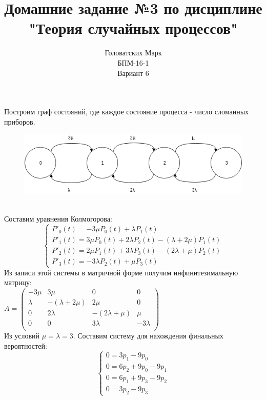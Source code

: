 \documentclass [a4paper,12pt]{article}
\title{Домашние задание №3 по дисциплине "Теория случайных процессов"}
\author{Головатских Марк \\БПМ-16-1 \\ Вариант 6}
\date{}
\begin{document}
\maketitle
{}
\newpage
{}
Построим граф состояний, где каждое состояние процесса - число сломанных приборов.\\
\begin{figure}[h!]
  \includegraphics[width=\linewidth]{pic3.png}
\end{figure}\\
Составим уравнения Колмогорова:\\
\begin{equation*}
\begin{cases}
  P'_0(t) = -3{\mu}P_0(t) + {\lambda}P_1(t)
  \\
  P'_1(t) = 3{\mu}P_0(t) + 2{\lambda}P_2(t) - (\lambda + 2{\mu})P_1(t)
  \\
  P'_2(t) = 2{\mu}P_1(t) + 3{\lambda}P_3(t) - (2{\lambda} + \mu)P_2(t)
  \\
  P'_3(t) = - 3{\lambda}P_2(t) + {\mu}P_3(t)
\end{cases}
\end{equation*}
Из записи этой системы в матричной форме получим инфинитезимальную матрицу:\\
$A = \left(
\begin{matrix}
-3{\mu} & 3{\mu} & 0 & 0\\
\lambda & -({\lambda} + 2{\mu}) & 2{\mu} & 0\\
0 & 2{\lambda} & -(2{\lambda} + \mu) & \mu \\
0 & 0 & 3{\lambda} & -3{\lambda} \\
\end{matrix}
\right) $\\
Из условий $\mu = \lambda = 3$. Составим систему для нахождения финальных вероятностей:\\
\begin{equation*}
\begin{cases}
0 = 3p_1 - 9p_0
\\
0 = 6p_2 + 9p_0 - 9p_1
\\
0 = 6p_1 + 9p_3 - 9p_2
\\
0 = 3p_2 - 9p_3
\end{cases}
\end{equation*}
\end{document}
